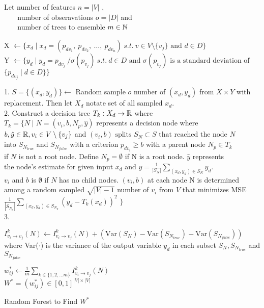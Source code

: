 \begin{algorithm}
    \DontPrintSemicolon
    \SetAlgoLined

    Let number of features $n = |V|$ , \\
    $\:\:\:\:\:\:\:$ number of obseravations $o = |D|$ and \\
    $\:\:\:\:\:\:\:$ number of trees to ensemble $ m \in \Bbb N$

     {
    X $\gets \{ x_d \mid x_d = (p_{dv_1},\: p_{dv_2},\: \ldots, \:p_{dv_{n}}) \: s.t. \: v \in V \setminus{\{v_j\}} \text{ and } d \in D \} \:$  \\
    Y $\gets \{ y_d  \mid y_d = p_{dv_j} \: / \sigma(p_{v_j}) \: s.t. \: d \in D \text{ and } \sigma(p_{v_j}) \text{ is a standard deviation of }$ \\
    $\{ p_{dv_j} \mid d \in D \} \}$\\

     {
    1. $S = \{(x_d, y_d)\} \gets $ Random sample $o$ number of $(x_d, y_d)$ from $X \times Y$ with replacement. Then let $X_d$ notate set of all sampled $x_d$. \\
    2. Construct a decision tree $T_k: X_d \to \Bbb R$ where\\
    $T_k = \{ N \mid N = (v_i, b, N_p, \hat{y}) $ represents a decision node where \\
    $ b, \hat{y} \in \Bbb R, v_i \in V \setminus{\{v_j\}} $ and $(v_i, b) \text{ splits } S_N \subset S \text{ that reached the node } N $\\
    into $S_{N_{true}}$ and $S_{N_{false}}$ with a criterion $p_{dv_i} \ge b$ with a parent node $ N_p \in T_k$ \\             if $N$ is not a root node. Define $N_p = \emptyset$ if N is a root node. $\hat{y}$ represents \\
    the node's estimate for given input $x_d$ and $\hat{y} = \frac{1}{|S_N|}\sum_{(x_d, y_d) \in S_N}y_d$.\\
    $v_i$ and $b$ is $\emptyset$ if $N$ has no child nodes.
    $(v_i, b)$ at each node N is determined \\ among a random sampled $\sqrt{|V|-1}$ number of $v_i$ from $V$ that minimizes MSE $\frac{1}{|S_{N_p}|}\sum_{(x_d, y_d) \in S_{N_p}}(y_d - T_k(x_d))^2$ $\}$\\
    3.
     {
    {
    $I^k_{v_i \to v_j}(N) \gets I^k_{v_i \to v_j}(N) + (\text{Var}(S_N) - \text{Var}(S_{N_{true}}) - \text{Var}(S_{N_{false}}))$ where Var($\cdot$) is the variance
    of the output variable $y_d$ in each subset $S_N, S_{N_{true}}$ and $S_{N_{false}}$
    }

    }

    }
    }
     $w^*_{ij} \gets \frac{1}{m}\sum_{k \in \{ 1, 2, ... m\}} I^k_{v_i \to v_j}(N)$ \\
     $W^* = (w^*_{ij}) \in [0,1]^{|V| \times |V|}$
    \caption{Random Forest to Find $W^*$}
    \label{rf}
\end{algorithm}
